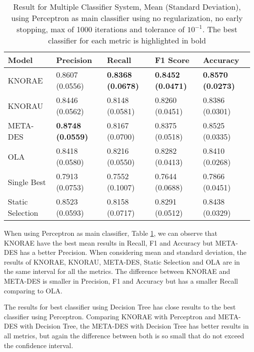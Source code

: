 \begin{table}[!h]
    \centering
    \renewcommand{\arraystretch}{1.8}
    \begin{tabular}{ p{3cm}p{2.8cm}p{2.8cm}p{2.8cm}p{2.8cm} }
        \toprule
        Model & Precision & Recall & F1 Score & Accuracy \\
        \midrule
        KNORAE &            0.8607 (0.0556) & \textbf{0.8368 (0.0678)} & \textbf{0.8452 (0.0471)} & \textbf{0.8570 (0.0273)} \\
        KNORAU &            0.8446 (0.0562) & 0.8148 (0.0581) & 0.8260 (0.0451) & 0.8386 (0.0301) \\
        META-DES &          \textbf{0.8748 (0.0559)} & 0.8167 (0.0700) & 0.8375 (0.0518) & 0.8525 (0.0335) \\
        OLA &               0.8418 (0.0580) & 0.8216 (0.0550) & 0.8282 (0.0413) & 0.8410 (0.0268) \\
        Single Best &       0.7913 (0.0753) & 0.7552 (0.1007) & 0.7644 (0.0688) & 0.7866 (0.0451) \\
        Static Selection &  0.8523 (0.0593) & 0.8158 (0.0717) & 0.8291 (0.0512) & 0.8438 (0.0329) \\ [1ex]
        \bottomrule
        \end{tabular}
        \caption{%
        Result for Multiple Classifier System, Mean (Standard Deviation), using Perceptron as main classifier using no regularization, no early stopping, max of 1000 iterations and tolerance of $10^{-1}$. The best classifier for each metric is highlighted in bold%
        }\label{mcs_perceptron_table}
\end{table}

When using Perceptron as main classifier, Table \ref{mcs_perceptron_table}, we can observe that KNORAE have the best mean results in Recall, F1 and Accuracy but META-DES has a better Precision. When considering mean and standard deviation, the results of KNORAE, KNORAU, META-DES, Static Selection and OLA are in the same interval for all the metrics. The difference between KNORAE and META-DES is smaller in Precision, F1 and Accuracy but has a smaller Recall comparing to OLA. 

The results for best classifier using Decision Tree has close results to the best classifier using Perceptron. Comparing KNORAE with Perceptron and META-DES with Decision Tree, the META-DES with Decision Tree has better results in all metrics, but again the difference between both is so small that do not exceed the confidence interval.

